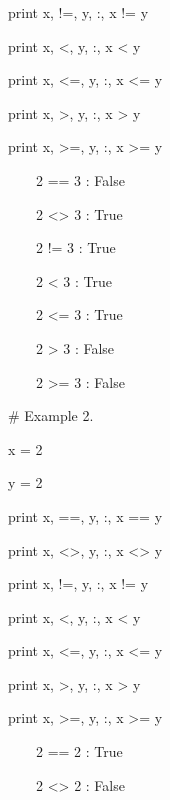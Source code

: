 \documentclass[12pt,oneside]{book}
\begin{document}
print x, {\textquotedbl}!={\textquotedbl}, y, {\textquotedbl}:{\textquotedbl}, x != y

print x, {\textquotedbl}{\textless}{\textquotedbl}, y, {\textquotedbl}:{\textquotedbl}, x {\textless} y

print x, {\textquotedbl}{\textless}={\textquotedbl}, y, {\textquotedbl}:{\textquotedbl}, x {\textless}= y

print x, {\textquotedbl}{\textgreater}{\textquotedbl}, y, {\textquotedbl}:{\textquotedbl}, x {\textgreater} y

print x, {\textquotedbl}{\textgreater}={\textquotedbl}, y, {\textquotedbl}:{\textquotedbl}, x {\textgreater}= y

{\textbar}

\ \ \ \ 2 == 3 : False

\ \ \ \ 2 {\textless}{\textgreater} 3 : True

\ \ \ \ 2 != 3 : True

\ \ \ \ 2 {\textless} 3 : True

\ \ \ \ 2 {\textless}= 3 : True

\ \ \ \ 2 {\textgreater} 3 : False

\ \ \ \ 2 {\textgreater}= 3 : False


\# Example 2.

x = 2

y = 2 \ 


print x, {\textquotedbl}=={\textquotedbl}, y, {\textquotedbl}:{\textquotedbl}, x == y

print x, {\textquotedbl}{\textless}{\textgreater}{\textquotedbl}, y, {\textquotedbl}:{\textquotedbl}, x {\textless}{\textgreater} y

print x, {\textquotedbl}!={\textquotedbl}, y, {\textquotedbl}:{\textquotedbl}, x != y

print x, {\textquotedbl}{\textless}{\textquotedbl}, y, {\textquotedbl}:{\textquotedbl}, x {\textless} y

print x, {\textquotedbl}{\textless}={\textquotedbl}, y, {\textquotedbl}:{\textquotedbl}, x {\textless}= y

print x, {\textquotedbl}{\textgreater}{\textquotedbl}, y, {\textquotedbl}:{\textquotedbl}, x {\textgreater} y

print x, {\textquotedbl}{\textgreater}={\textquotedbl}, y, {\textquotedbl}:{\textquotedbl}, x {\textgreater}= y

{\textbar}

\ \ \ \ 2 == 2 : True

\ \ \ \ 2 {\textless}{\textgreater} 2 : False
\end{document}
